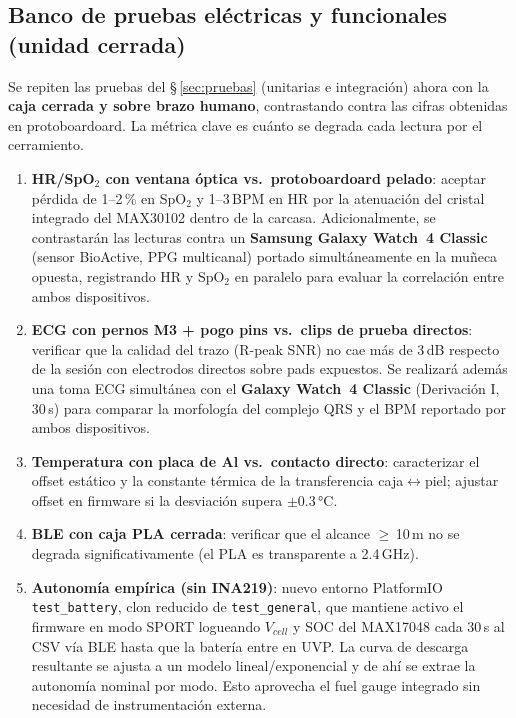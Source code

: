 \documentclass[letterpaper,11pt]{article}
\begin{document}
\subsection{Banco de pruebas eléctricas y funcionales (unidad cerrada)}
\label{sec:pruebas_elec}
Se repiten las pruebas del §\,\ref{sec:pruebas} (unitarias e integración) ahora con la
\textbf{caja cerrada y sobre brazo humano}, contrastando contra las cifras obtenidas en
protoboardoard. La métrica clave es cuánto se degrada cada lectura por el cerramiento.

\begin{enumerate}
    \item \textbf{HR/SpO$_2$ con ventana óptica vs.\ protoboardoard pelado}: aceptar pérdida
    de 1--2\,\% en SpO$_2$ y 1--3\,BPM en HR por la atenuación del cristal integrado del
    MAX30102 dentro de la carcasa. Adicionalmente, se contrastarán las lecturas contra
    un \textbf{Samsung Galaxy Watch~4 Classic} (sensor BioActive, PPG multicanal) portado
    simultáneamente en la muñeca opuesta, registrando HR y SpO$_2$ en paralelo para
    evaluar la correlación entre ambos dispositivos.

    \item \textbf{ECG con pernos M3 + pogo pins vs.\ clips de prueba directos}: verificar que
    la calidad del trazo (R-peak SNR) no cae más de 3\,dB respecto de la sesión con
    electrodos directos sobre pads expuestos. Se realizará además una toma ECG simultánea
    con el \textbf{Galaxy Watch~4 Classic} (Derivación I, 30\,s) para comparar la
    morfología del complejo QRS y el BPM reportado por ambos dispositivos.

    \item \textbf{Temperatura con placa de Al vs.\ contacto directo}: caracterizar el offset
    estático y la constante térmica de la transferencia caja$\leftrightarrow$piel; ajustar
    offset en firmware si la desviación supera $\pm 0.3$\,°C.

    \item \textbf{BLE con caja PLA cerrada}: verificar que el alcance $\geq$\,10\,m no se
    degrada significativamente (el PLA es transparente a 2.4\,GHz).

    \item \textbf{Autonomía empírica (sin INA219)}: nuevo entorno PlatformIO
    \texttt{test\_battery}, clon reducido de \texttt{test\_general}, que mantiene activo el
    firmware en modo SPORT logueando $V_{cell}$ y SOC del MAX17048 cada 30\,s al CSV vía BLE
    hasta que la batería entre en UVP. La curva de descarga resultante se ajusta a un modelo
    lineal/exponencial y de ahí se extrae la autonomía nominal por modo. Esto aprovecha el
    fuel gauge integrado sin necesidad de instrumentación externa.
\end{enumerate}
\end{document}
